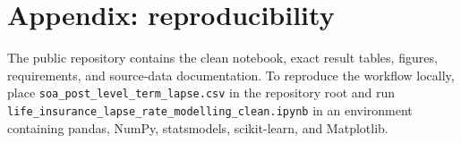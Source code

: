 \documentclass[11pt,a4paper]{article}
\theoremstyle{definition}
\begin{document}
\section{Appendix: reproducibility}
The public repository contains the clean notebook, exact result tables, figures, requirements, and source-data documentation. To reproduce the workflow locally, place \texttt{soa\_post\_level\_term\_lapse.csv} in the repository root and run \texttt{life\_insurance\_lapse\_rate\_modelling\_clean.ipynb} in an environment containing pandas, NumPy, statsmodels, scikit-learn, and Matplotlib.
\end{document}
